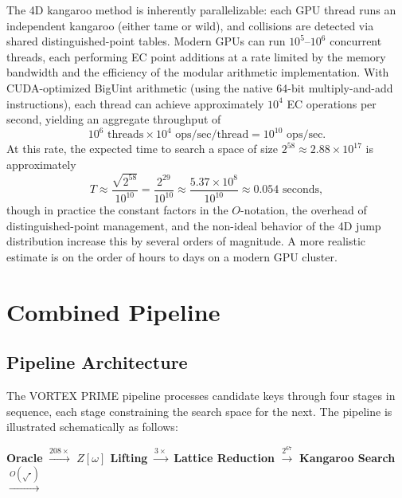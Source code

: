 \documentclass[11pt,a4paper]{article}
\theoremstyle{definition}
\begin{document}
The 4D kangaroo method is inherently parallelizable: each GPU thread runs an independent kangaroo (either tame or wild), and collisions are detected via shared distinguished-point tables. Modern GPUs can run $10^5$--$10^6$ concurrent threads, each performing EC point additions at a rate limited by the memory bandwidth and the efficiency of the modular arithmetic implementation. With CUDA-optimized BigUint arithmetic (using the native 64-bit multiply-and-add instructions), each thread can achieve approximately $10^4$ EC operations per second, yielding an aggregate throughput of
\begin{equation}
  10^6 \text{ threads} \times 10^4 \text{ ops/sec/thread} = 10^{10} \text{ ops/sec}.
  \label{eq:gpu-throughput}
\end{equation}
At this rate, the expected time to search a space of size $2^{58} \approx 2.88 \times 10^{17}$ is approximately
\begin{equation}
  T \approx \frac{\sqrt{2^{58}}}{10^{10}} = \frac{2^{29}}{10^{10}} \approx \frac{5.37 \times 10^8}{10^{10}} \approx 0.054 \text{ seconds},
\end{equation}
though in practice the constant factors in the $O$-notation, the overhead of distinguished-point management, and the non-ideal behavior of the 4D jump distribution increase this by several orders of magnitude. A more realistic estimate is on the order of hours to days on a modern GPU cluster.

\section{Combined Pipeline}

\subsection{Pipeline Architecture}

The VORTEX PRIME pipeline processes candidate keys through four stages in sequence, each stage constraining the search space for the next. The pipeline is illustrated schematically as follows:

\begin{center}
  \begin{tcolorbox}[colback=blue!3,colframe=blue!60!black]
    \centering
    \textbf{Oracle} $\xrightarrow{208\times}$ \textbf{$Z[\omega]$ Lifting} $\xrightarrow{3\times}$ \textbf{Lattice Reduction} $\xrightarrow{2^{67}}$ \textbf{Kangaroo Search} $\xrightarrow{O(\sqrt{\cdot})}$
  \end{tcolorbox}
\end{center}
\end{document}
